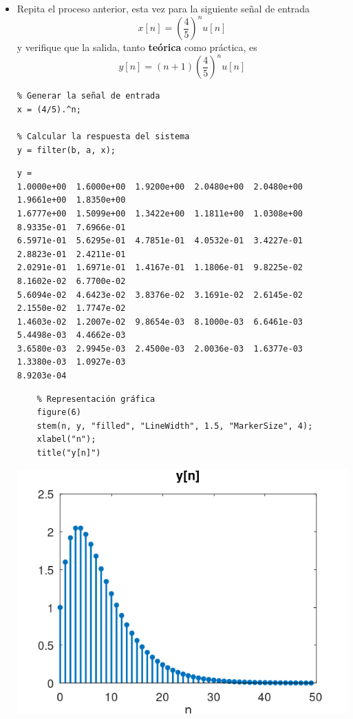 \documentclass[12pt]{article}
\begin{document}
\begin{itemize}
	\item Repita el proceso anterior, esta vez para la siguiente señal de entrada \[ x[n]=\left(\dfrac{4}{5}\right)^nu[n] \] y verifique que la salida, tanto \textbf{teórica} como práctica, es \[ y[n]=(n+1)\left(\dfrac{4}{5}\right)^nu[n] \]

\begin{lstlisting}
% Generar la señal de entrada
x = (4/5).^n;

% Calcular la respuesta del sistema
y = filter(b, a, x);
\end{lstlisting}

\begin{verbatim}
y =
1.0000e+00  1.6000e+00  1.9200e+00  2.0480e+00  2.0480e+00  1.9661e+00  1.8350e+00  
1.6777e+00  1.5099e+00  1.3422e+00  1.1811e+00  1.0308e+00  8.9335e-01  7.6966e-01  
6.5971e-01  5.6295e-01  4.7851e-01  4.0532e-01  3.4227e-01  2.8823e-01  2.4211e-01  
2.0291e-01  1.6971e-01  1.4167e-01  1.1806e-01  9.8225e-02  8.1602e-02  6.7700e-02  
5.6094e-02  4.6423e-02  3.8376e-02  3.1691e-02  2.6145e-02  2.1550e-02  1.7747e-02  
1.4603e-02  1.2007e-02  9.8654e-03  8.1000e-03  6.6461e-03  5.4498e-03  4.4662e-03  
3.6580e-03  2.9945e-03  2.4500e-03  2.0036e-03  1.6377e-03  1.3380e-03  1.0927e-03  
8.9203e-04
\end{verbatim}

\begin{lstlisting}
	% Representación gráfica
	figure(6)
	stem(n, y, "filled", "LineWidth", 1.5, "MarkerSize", 4);
	xlabel("n");
	title("y[n]")
\end{lstlisting}

\begin{center}
	\includegraphics[width=0.7\linewidth]{Imágenes/Figura6}
\end{center}
\end{itemize}
\end{document}
